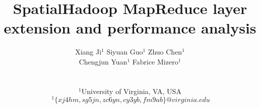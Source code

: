 \documentclass{sig-alternate}
\title{SpatialHadoop MapReduce layer extension and
performance analysis}
\author{
Xiang Ji$^{1}$ \hspace*{0.07in}
Siyuan Guo$^{1}$\hspace*{0.07in}
Zhuo Chen$^{1}$\hspace*{0.07in}\\
Chengjun Yuan$^{1}$ \hspace*{0.07in}
Fabrice Mizero$^{1}$ \hspace*{0.07in}\\
\\~\\
%
\fontsize{10}{10}\selectfont\ttfamily\upshape
$^{1}$University of Virginia, VA, USA\\
\fontsize{9}{9}\selectfont\ttfamily\itshape
$~^{1}\{xj4hm, sg5jn, zc6yn, cy3yb, fm9ab\}@virginia.edu$\\
%
\fontsize{10}{10}\selectfont\ttfamily\upshape
\\~\\
}
\begin{document}
\maketitle

\sloppy

%





%

%

%

%

%
%
%

%




%
%

\end{document}

